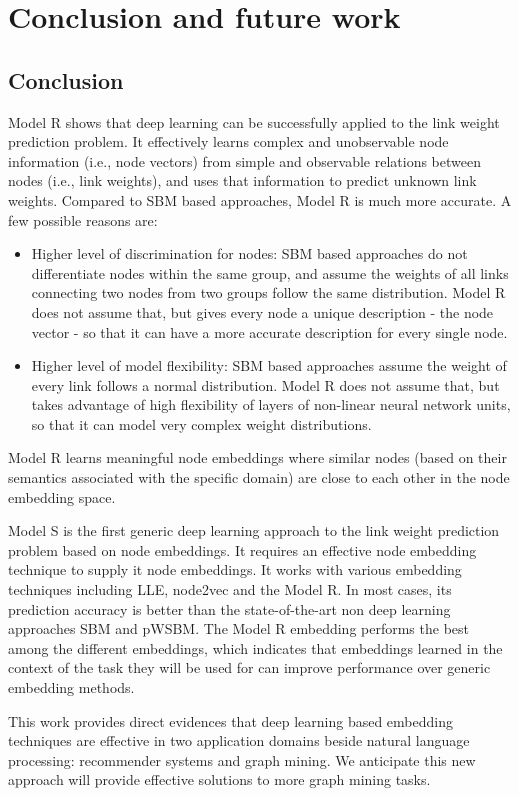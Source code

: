 \documentclass[12pt]{WSUThesis}
\theoremstyle{definition}
\begin{document}
\chapter{Conclusion and future work}

\section{Conclusion}
Model R shows that deep learning can be successfully applied to the link weight prediction problem.
It effectively learns complex and unobservable node information (i.e., node vectors) from simple and observable relations between nodes (i.e., link weights),
and uses that information to predict unknown link weights.
Compared to SBM based approaches, Model R is much more accurate.
A few possible reasons are:
\begin{itemize}
	\item Higher level of discrimination for nodes:
	SBM based approaches do not differentiate nodes within the same group,
	and assume the weights of all links connecting two nodes from two groups
	follow the same distribution.
	Model R does not assume that,
	but gives every node a unique description - the node vector - so that
	it can have a more accurate description for every single node.
	\item Higher level of model flexibility:
	SBM based approaches assume the weight of every link follows
	a normal distribution.
	Model R does not assume that, but takes advantage of high flexibility of
	layers of non-linear neural network units,
	so that it can model very complex weight distributions.
\end{itemize}
Model R learns meaningful node embeddings where similar nodes (based on their semantics associated with the specific domain) are close to each other in the node embedding space.

Model S is the first generic deep learning approach to the link weight prediction problem based on node embeddings.
It requires an effective node embedding technique to supply it node embeddings.
It works with various embedding techniques including
LLE, node2vec and the Model R.
In most cases, its prediction accuracy is better than the state-of-the-art non deep learning approaches SBM and pWSBM.
The Model R embedding performs the best among the different embeddings, which indicates that embeddings learned in the context of the task they will be used for can improve performance over generic embedding methods.

This work provides direct evidences that deep learning based embedding techniques are effective in two application domains beside natural language processing: recommender systems and graph mining.
We anticipate this new approach will provide effective solutions to more
graph mining tasks.
\end{document}
